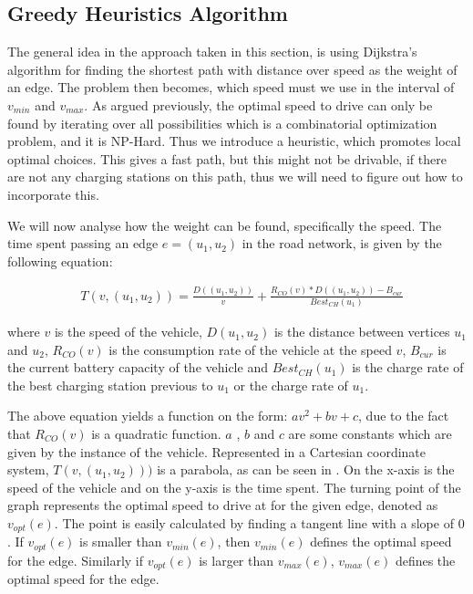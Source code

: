 \subsection{Greedy Heuristics Algorithm}

The general idea in the approach taken in this section, is using Dijkstra's algorithm for finding the shortest path with distance over speed as the weight of an edge. The problem then becomes, which speed must we use in the interval of $v_{min}$ and $v_{max}$. As argued previously, the optimal speed to drive can only be found by iterating over all possibilities which is a combinatorial optimization problem, and it is NP-Hard. Thus we introduce a heuristic, which promotes local optimal choices. This gives a fast path, but this might not be drivable, if there are not any charging stations on this path, thus we will need to figure out how to incorporate this.

We will now analyse how the weight can be found, specifically the speed. The time spent passing an edge $e = (u_1, u_2)$ in the road network, is given by the following equation:

\begin{equation*}
\begin{aligned}
 & T(v,(u_1, u_2)) = \frac{D((u_1, u_2))}{v} + \frac{R_{CO}(v) * D((u_1, u_2)) - B_{cur}}{Best_{CH}(u_1)}
\end{aligned}
\end{equation*}\label{eq:drivingAndCharging}

where $v$ is the speed of the vehicle, $D(u_1, u_2)$ is the distance between vertices $u_1$ and $u_2$, $R_{CO}(v)$ is the consumption rate of the vehicle at the speed $v$, $B_{cur}$ is the current battery capacity of the vehicle 
and $Best_{CH}(u_1)$ is the charge rate of the best charging station previous to $u_1$ or the charge rate of $u_1$.

The above equation yields a function on the form: $av^2 + bv + c$, due to the fact that 
$R_{CO}(v)$ is a quadratic function. $a$ , $b$ and $c$ are some constants which are given by the instance of the vehicle. 
Represented in a Cartesian coordinate system, $T(v,(u_1, u_2)))$ is a parabola, as can be seen in . On the x-axis is the speed of the vehicle and on the y-axis is the time spent. The turning point of the graph represents the optimal speed to drive at for the given edge, denoted as $v_{opt}(e)$. The point is easily calculated by finding a tangent line with a slope of $0$. If $v_{opt}(e)$ is smaller than $v_{min}(e)$, then $v_{min}(e)$ defines the optimal speed for the edge. Similarly if $v_{opt}(e)$ is larger than $v_{max}(e)$, $v_{max}(e)$ defines the optimal speed for the edge.

